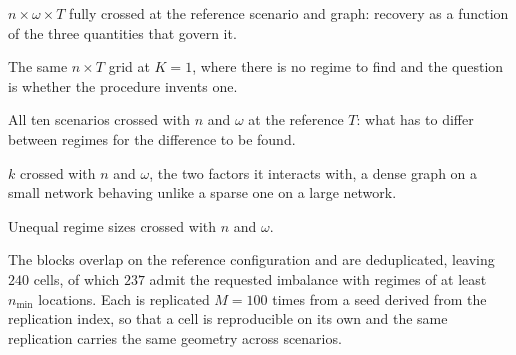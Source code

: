 \begin{description}[leftmargin=1.2em,itemsep=3pt,topsep=3pt]
  \item[\textbf{Core} (45 cells).] $n \times \omega \times T$ fully crossed at the reference scenario and graph: recovery as a function of the three quantities that govern it.
  \item[\textbf{Null} (15 cells).] The same $n \times T$ grid at $K=1$, where there is no regime to find and the question is whether the procedure invents one.
  \item[\textbf{Scenarios} (150 cells).] All ten scenarios crossed with $n$ and $\omega$ at the reference $T$: what has to differ between regimes for the difference to be found.
  \item[\textbf{Graph} (45 cells).] $k$ crossed with $n$ and $\omega$, the two factors it interacts with, a dense graph on a small network behaving unlike a sparse one on a large network.
  \item[\textbf{Balance} (15 cells).] Unequal regime sizes crossed with $n$ and $\omega$.
\end{description}

The blocks overlap on the reference configuration and are deduplicated, leaving $240$ cells, of which $237$ admit the requested imbalance with regimes of at least $n_{\min}$ locations. Each is replicated $M = 100$ times from a seed derived from the replication index, so that a cell is reproducible on its own and the same replication carries the same geometry across scenarios.

